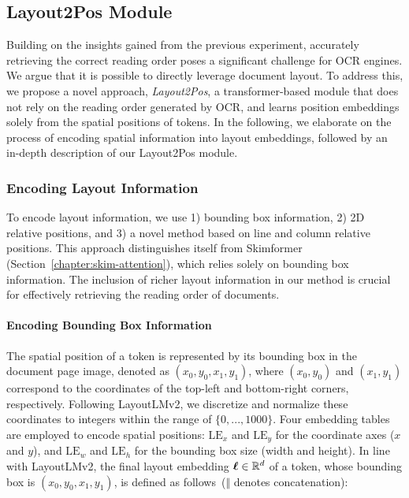 \subsection{Layout2Pos Module}

Building on the insights gained from the previous experiment, accurately retrieving the correct reading order poses a significant challenge for \ac{OCR} engines. We argue that it is possible to directly leverage document layout. To address this, we propose a novel approach, \textit{Layout2Pos}, a transformer-based module that does not rely on the reading order generated by \ac{OCR}, and learns position embeddings solely from the spatial positions of tokens. In the following, we elaborate on the process of encoding spatial information into layout embeddings, followed by an in-depth description of our Layout2Pos module.


\subsubsection{Encoding Layout Information}

To encode layout information, we use 1) bounding box information, 2) 2D relative positions, and 3) a novel method based on line and column relative positions. This approach distinguishes itself from Skimformer (Section~\ref{chapter:skim-attention}), which relies solely on bounding box information. The inclusion of richer layout information in our method is crucial for effectively retrieving the reading order of documents.

\paragraph{Encoding Bounding Box Information} 

The spatial position of a token is represented by its bounding box in the document page image, denoted as $(x_0, y_0, x_1, y_1)$, where $(x_0, y_0)$ and $(x_1, y_1)$ correspond to the coordinates of the top-left and bottom-right corners, respectively. Following LayoutLMv2, we discretize and normalize these coordinates to integers within the range of $\{0, ..., 1000\}$. Four embedding tables are employed to encode spatial positions: $\text{LE}_x$ and $\text{LE}_y$ for the coordinate axes ($x$ and $y$), and $\text{LE}_w$ and $\text{LE}_h$ for the bounding box size (width and height). In line with LayoutLMv2, the final layout embedding $\boldsymbol{\ell} \in \mathbb{R}^{d}$ of a token, whose bounding box is $(x_0, y_0, x_1, y_1)$, is defined as follows~($\mathbin\Vert$ denotes concatenation):

